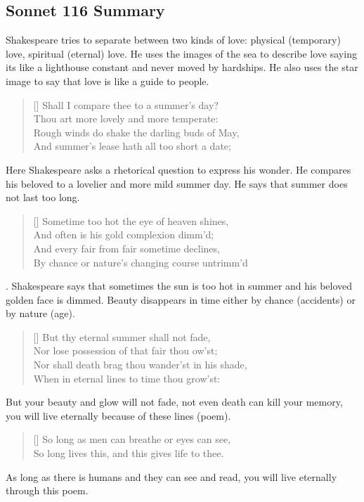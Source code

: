 \documentclass[12pt, a4paper]{article}
\begin{document}
\subsection*{Sonnet 116 Summary}
{\fontpar
Shakespeare tries to separate between two kinds of love:
physical (temporary) love, spiritual
(eternal) love. He uses the images of the sea to describe love
saying its like a lighthouse constant and never moved by hardships.
He also uses the star image to say that love is like a guide to people.
}

\settowidth{\versewidth}{Shall I compare thee to a summer’s day?}
\begin{verse}[\versewidth]
{\fontverse
Shall I compare thee to a summer’s day?\\
Thou art more lovely and more temperate: \\
Rough winds do shake the darling buds of May, \\
And summer’s lease hath all too short a date; 
}
\end{verse}
{\fontpar
Here Shakespeare asks a rhetorical question to 
express his wonder. He compares his beloved to a lovelier and
more mild summer day. He says that summer does not last too long.
}

\begin{verse}[\versewidth]
{\fontverse
Sometime too hot the eye of heaven shines, \\
And often is his gold complexion dimm'd; \\
And every fair from fair sometime declines, \\
By chance or nature’s changing course untrimm'd
}
\end{verse}

{\fontpar
{}. Shakespeare says that sometimes
the sun is too hot in summer and his beloved golden face is dimmed.
Beauty disappears in time either by chance (accidents) or by
nature (age).
}

\begin{verse}[\versewidth]
{\fontverse
But thy eternal summer shall not fade, \\
Nor lose possession of that fair thou ow’st; \\
Nor shall death brag thou wander’st in his shade, \\
When in eternal lines to time thou grow’st:
}
\end{verse}
{\fontpar
But your beauty and glow will not fade, not even death can
kill your memory, you will live eternally because of these
lines (poem).
}
\begin{verse}[\versewidth]
{\fontverse
So long as men can breathe or eyes can see,\\
So long lives this, and this gives life to thee.
}
\end{verse}
{\fontpar
As long as there is humans and they can see and read,
you will live eternally through this poem.
}
\end{document}
